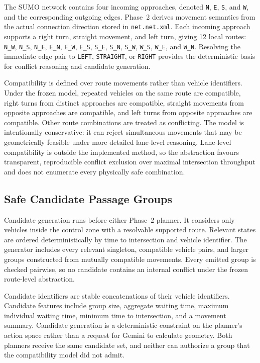 \documentclass[letterpaper,10pt,conference]{ieeeconf}
\begin{document}
The SUMO network contains four incoming approaches, denoted \texttt{N}, \texttt{E}, \texttt{S}, and \texttt{W}, and the corresponding outgoing edges. Phase~2 derives movement semantics from the actual connection direction stored in \texttt{net.net.xml}. Each incoming approach supports a right turn, straight movement, and left turn, giving 12 local routes: \texttt{N\_W}, \texttt{N\_S}, \texttt{N\_E}, \texttt{E\_N}, \texttt{E\_W}, \texttt{E\_S}, \texttt{S\_E}, \texttt{S\_N}, \texttt{S\_W}, \texttt{W\_S}, \texttt{W\_E}, and \texttt{W\_N}. Resolving the immediate edge pair to \texttt{LEFT}, \texttt{STRAIGHT}, or \texttt{RIGHT} provides the deterministic basis for conflict reasoning and candidate generation.



Compatibility is defined over route movements rather than vehicle identifiers. Under the frozen model, repeated vehicles on the same route are compatible, right turns from distinct approaches are compatible, straight movements from opposite approaches are compatible, and left turns from opposite approaches are compatible. Other route combinations are treated as conflicting. The model is intentionally conservative: it can reject simultaneous movements that may be geometrically feasible under more detailed lane-level reasoning. Lane-level compatibility is outside the implemented method, so the abstraction favours transparent, reproducible conflict exclusion over maximal intersection throughput and does not enumerate every physically safe combination.



\subsection{Safe Candidate Passage Groups}



Candidate generation runs before either Phase~2 planner. It considers only vehicles inside the control zone with a resolvable supported route. Relevant states are ordered deterministically by time to intersection and vehicle identifier. The generator includes every relevant singleton, compatible vehicle pairs, and larger groups constructed from mutually compatible movements. Every emitted group is checked pairwise, so no candidate contains an internal conflict under the frozen route-level abstraction.



Candidate identifiers are stable concatenations of their vehicle identifiers. Candidate features include group size, aggregate waiting time, maximum individual waiting time, minimum time to intersection, and a movement summary. Candidate generation is a deterministic constraint on the planner's action space rather than a request for Gemini to calculate geometry. Both planners receive the same candidate set, and neither can authorize a group that the compatibility model did not admit.
\end{document}
